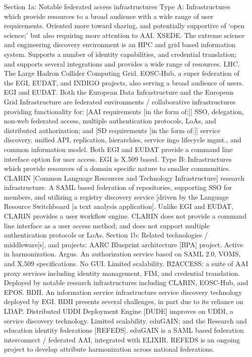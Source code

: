 \documentclass[12pt]{article}
\begin{document}
Section 1a: Notable federated access infrastructures 
Type A: 
Infrastructures which provide resources to a broad audience with a wide range of user requirements. Oriented more toward sharing, and potentially supportive of ‘open science;’ but also requiring more attention to AAI. 
XSEDE. The extreme science and engineering discovery environment is an HPC and grid based information system. Supports a number of identity capabilities, and credential translation; and supports several integrations and provides a wide range of resources. 
LHC. The Large Hadron Collider Computing Grid. 
EOSC-Hub, a super federation of the EGI, EUDAT, and INDIGO projects, also serving a broad audience of users. 
EGI and EUDAT. Both the European Data Infrastructure and the European Grid Infrastructure are federated environments / collaborative infrastructures providing functionality for: [AAI requirements [in the form of:]] SSO, delegation, non-web federated access, multiple authentication protocols, LoAs, and distributed authorization; and [SD requirements [in the form of:]] service discovery, unified API, replication, hierarchies, service ingo lifecycle mgmt., and common information model. Both EGI and EUDAT provide a command line interface option for user access. EGI is X.509 based. 
Type B: 
Infrastructures which provide resources of a domain specific nature to smaller communities. 
CLARIN [Common Language Resources and Technology Infrastructure] research infrastructure. A SAML based federation of repositories, supporting SSO for members, and utilizing a registry discovery service [driven by the Language Resource Switchboard [a text analysis application]. Unlike EGI and EUDAT, CLARIN provides a user workflow engine. CLARIN does not provide a command line interface as a user access method; and does not support multiple authentication protocols or LoAs. 
Section 1b: Related technologies / middleware[s], and projects: 
AARC Blueprint architecture [BPA] project. Active in harmonization. 
Argus. An authorization service based on SAML 2.0, VOMS, and X.509 specifications. No GUI. Limited scalability. 
B2ACCESS: a suite of AAI proxy services including identity management, FIM, and credential translation. Deployed by notable research infrastructures including CLARIN, EOSC-Hub, and EPOS.  
BDII. An information service infrastructure service discovery technology deployed by EGI. BDII presents several challenges, in part due to its reliance on LDAP. 
Distributed UDDI Deployment Engine [DUDE] improves on UDDI, a service discovery technology. Limited scalability. 
eduGAIN; and the Research and education identity federations [REFEDS]. eduGAIN is a SAML based federation interconnect / federated AAI, integrated with ELIXIR. REFEDS is an ongoing project to develop attribute harmonization across national federations. 
\end{document}
